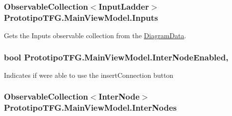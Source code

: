 \hypertarget{class_prototipo_t_f_g_1_1_main_view_model_ab9088a1a4c50cf9579255659265c432f}{}
\subsubsection[{Inputs}]{\setlength{\rightskip}{0pt plus 5cm}Observable\+Collection$<${\bf Input\+Ladder}$>$ Prototipo\+T\+F\+G.\+Main\+View\+Model.\+Inputs\hspace{0.3cm}{\ttfamily [get]}}\label{class_prototipo_t_f_g_1_1_main_view_model_ab9088a1a4c50cf9579255659265c432f}


Gets the Inputs observable collection from the \hyperlink{class_prototipo_t_f_g_1_1_diagram_data}{Diagram\+Data}. 

\hypertarget{class_prototipo_t_f_g_1_1_main_view_model_a2517a0d1f92fd6dd07e360fd4e3b1d51}{}
\subsubsection[{Inter\+Node\+Enabled}]{\setlength{\rightskip}{0pt plus 5cm}bool Prototipo\+T\+F\+G.\+Main\+View\+Model.\+Inter\+Node\+Enabled\hspace{0.3cm}{\ttfamily [get]}, {\ttfamily [set]}}\label{class_prototipo_t_f_g_1_1_main_view_model_a2517a0d1f92fd6dd07e360fd4e3b1d51}


Indicates if we\textquotesingle{}re able to use the insert\+Connection button 

\hypertarget{class_prototipo_t_f_g_1_1_main_view_model_a9d1162ef26fcdc6beadb217bea2a85e7}{}
\subsubsection[{Inter\+Nodes}]{\setlength{\rightskip}{0pt plus 5cm}Observable\+Collection$<${\bf Inter\+Node}$>$ Prototipo\+T\+F\+G.\+Main\+View\+Model.\+Inter\+Nodes\hspace{0.3cm}{\ttfamily [get]}}\label{class_prototipo_t_f_g_1_1_main_view_model_a9d1162ef26fcdc6beadb217bea2a85e7}


